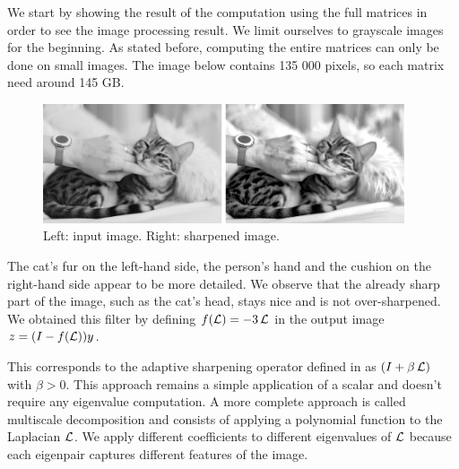 We start by showing the result of the computation using the full matrices in order to see the image processing result.
We limit ourselves to grayscale images for the beginning.
As stated before, computing the entire matrices can only be done on small images.
The image below contains 135 000 pixels, so each matrix need around 145 GB.

\begin{figure}[H]
  \centering
  \includegraphics[width=0.95\textwidth]{img/cat.png}
  \caption{Left: input image. Right: sharpened image.}
\end{figure}

The cat's fur on the left-hand side, the person's hand and the cushion on the right-hand side appear to be more detailed.
We observe that the already sharp part of the image, such as the cat's head, stays nice and is not over-sharpened.
We obtained this filter by defining \(f(\operatorname{\mathcal{L}}) = -3\operatorname{\mathcal{L}}\) in the output image \(z = (I - f(\operatorname{\mathcal{L}}))y\).

This corresponds to the adaptive sharpening operator defined in \cite{siam_slides_2016} as \((I + \beta \operatorname{\mathcal{L}})\) with \(\beta > 0\).
This approach remains a simple application of a scalar and doesn't require any eigenvalue computation.
A more complete approach is called multiscale decomposition \cite{talebi_nonlocal_2014} and consists of applying a polynomial function to the Laplacian \(\operatorname{\mathcal{L}}\).
We apply different coefficients to different eigenvalues of \(\operatorname{\mathcal{L}}\) because each eigenpair captures different features of the image.
